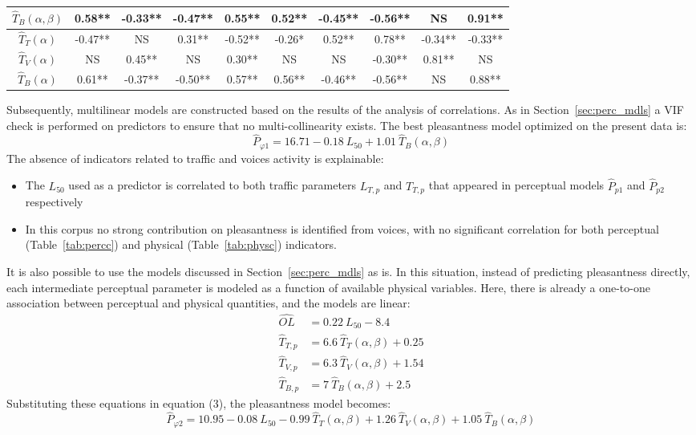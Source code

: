 \documentclass[11pt,a4paper]{article}
\begin{document}
\begin{table}
{\begin{tabular}{ c | c c c c c | c c c c }
	$\hat T_B(\alpha, \beta)$ & 0.58** & -0.33** & -0.47** & 0.55** & 0.52** & -0.45** & -0.56** & NS & 0.91** \\ \hline
	$\hat T_T(\alpha)$ & -0.47** & NS & 0.31** & -0.52** & -0.26* & 0.52** & 0.78** & -0.34** & -0.33** \\
	$\hat T_V(\alpha)$ & NS & 0.45** & NS & 0.30** & NS & NS & -0.30** & 0.81** & NS \\
	$\hat T_B(\alpha)$ & 0.61** & -0.37** & -0.50** & 0.57** & 0.56** & -0.46** & -0.56** & NS & 0.88** \\ \hline
\end{tabular}
}
\end{table}


Subsequently, multilinear models are constructed based on the results of the analysis of correlations. As in Section~\ref{sec:perc_mdls} a VIF check is performed on predictors to ensure that no multi-collinearity exists. The best pleasantness model optimized on the present data is:
\begin{equation}
\hat P_{\varphi 1} = 16.71 - 0.18~L_{50} + 1.01~\hat T_B(\alpha, \beta)
\end{equation}
The absence of indicators related to traffic and voices activity is explainable:
\begin{itemize}
\item The $L_{50}$ used as a predictor is correlated to both traffic parameters $L_{T, p}$ and $T_{T, p}$ that appeared in perceptual models $\hat P_{p1}$ and $\hat P_{p2}$ respectively
\item In this corpus no strong contribution on pleasantness is identified from voices, with no significant correlation for both perceptual (Table~\ref{tab:percc}) and physical (Table~\ref{tab:physc}) indicators.
\end{itemize}
It is also possible to use the models discussed in Section~\ref{sec:perc_mdls} as is. In this situation, instead of predicting pleasantness directly, each intermediate perceptual parameter is modeled as a function of available physical variables. Here, there is already a one-to-one association between perceptual and physical quantities, and the models are linear:
\begin{align}
\hat{OL} &= 0.22~L_{50} - 8.4\\
\hat{T}_{T, p} &= 6.6~\hat T_{T}(\alpha, \beta) + 0.25\\
\hat{T}_{V, p} &= 6.3~\hat T_{V}(\alpha, \beta) + 1.54\\
\hat{T}_{B, p} &= 7~\hat T_{B}(\alpha, \beta) + 2.5
\end{align}
Substituting these equations in equation (3), the pleasantness model becomes:
\begin{equation}
\hat P_{\varphi 2} = 10.95 - 0.08~L_{50} - 0.99~\hat T_{T}(\alpha, \beta) + 1.26~\hat T_{V}(\alpha, \beta) + 1.05~\hat T_{B}(\alpha, \beta)
\end{equation}
\end{document}
